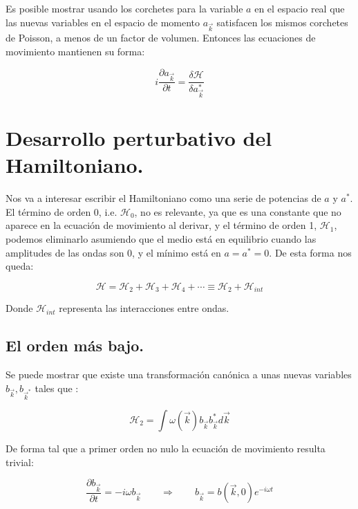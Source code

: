 Es posible mostrar usando los corchetes para la variable $a$ en el espacio real que las nuevas variables en el espacio de momento $a_{\vec k}$ satisfacen los mismos corchetes de Poisson, a menos de un factor de volumen. Entonces las ecuaciones de movimiento mantienen su forma:

\begin{equation}
	i\frac{\partial a_{\vec k}}{\partial t} = \frac{\delta \mathcal{H}}{\delta a_{\vec k}^*}
\end{equation}


\section{Desarrollo perturbativo del Hamiltoniano.}
Nos va a interesar escribir el Hamiltoniano como una serie de potencias de $a$ y $a^*$. El término de orden 0, i.e. $\mathcal{H}_0$, no es relevante, ya que es una constante que no aparece en la ecuación de movimiento al derivar, y el término de orden 1, $\mathcal{H}_1$, podemos eliminarlo asumiendo que el medio está en equilibrio cuando las amplitudes de las ondas son 0, y el mínimo está en $a=a^*=0$. De esta forma nos queda:

\begin{equation}
	\mathcal{H} = \mathcal{H}_2 + \mathcal{H}_3 + \mathcal{H}_4 + \cdots \equiv \mathcal{H}_2 + \mathcal{H}_{int}
\end{equation}

Donde $\mathcal{H}_{int}$ representa las interacciones entre ondas. 
\subsection*{El orden más bajo.}

Se puede mostrar que existe una transformación canónica a unas nuevas variables $b_{\vec{k}},b_{\vec{k}^*}$ tales que \cite{zakharovKolmogorovSpectraTurbulence1992}:

\begin{equation}
	\mathcal{H}_2 = \int \omega(\vec k)b_{\vec k}b^*_{\vec k} d\vec k 
\end{equation} 

De forma tal que a primer orden no nulo la ecuación de movimiento resulta trivial:

\begin{equation}
	\frac{\partial b_{\vec{k}}}{\partial t}=-i\omega b_{\vec{k}} \qquad \Rightarrow{} \qquad b_{\vec{k}}=b(\vec k, 0)e^{-i\omega t}
\end{equation}

